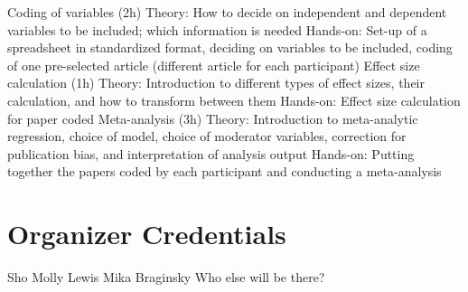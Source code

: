 \documentclass[10pt,letterpaper]{article}
\begin{document}
Coding of variables (2h)
Theory: How to decide on independent and dependent variables to be included; which information is needed
Hands-on: Set-up of a spreadsheet in standardized format, deciding on variables to be included, coding of one pre-selected article (different article for each participant)
Effect size calculation (1h)
Theory: Introduction to different types of effect sizes, their calculation, and how to transform between them
Hands-on: Effect size calculation for paper coded
Meta-analysis (3h)
Theory: Introduction to meta-analytic regression, choice of model, choice of moderator variables, correction for publication bias, and interpretation of analysis output
Hands-on: Putting together the papers coded by each participant and conducting a meta-analysis

\section{Organizer Credentials}

Sho
Molly Lewis
Mika Braginsky
Who else will be there?
%







\setlength{\bibleftmargin}{.125in}
\setlength{\bibindent}{-\bibleftmargin}


\end{document}
